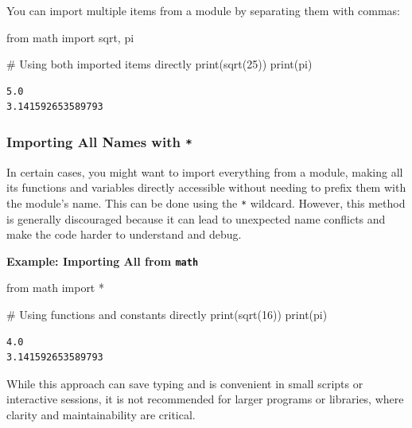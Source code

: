 \documentclass[
  letterpaper,
  DIV=11,
  numbers=noendperiod]{scrreprt}
\newenvironment{Shaded}{\begin{snugshade}}{\end{snugshade}}
\newcommand{\BuiltInTok}[1]{\textcolor[rgb]{0.00,0.23,0.31}{#1}}
\newcommand{\CommentTok}[1]{\textcolor[rgb]{0.37,0.37,0.37}{#1}}
\newcommand{\DecValTok}[1]{\textcolor[rgb]{0.68,0.00,0.00}{#1}}
\newcommand{\ImportTok}[1]{\textcolor[rgb]{0.00,0.46,0.62}{#1}}
\newcommand{\NormalTok}[1]{\textcolor[rgb]{0.00,0.23,0.31}{#1}}
\newcommand{\OperatorTok}[1]{\textcolor[rgb]{0.37,0.37,0.37}{#1}}
\begin{document}
You can import multiple items from a module by separating them with
commas:

\begin{Shaded}
\begin{Highlighting}[]
\ImportTok{from}\NormalTok{ math }\ImportTok{import}\NormalTok{ sqrt, pi}

\CommentTok{\# Using both imported items directly}
\BuiltInTok{print}\NormalTok{(sqrt(}\DecValTok{25}\NormalTok{))  }
\BuiltInTok{print}\NormalTok{(pi)       }
\end{Highlighting}
\end{Shaded}

\begin{verbatim}
5.0
3.141592653589793
\end{verbatim}

\hypertarget{importing-all-names-with}{%
\subsubsection{\texorpdfstring{Importing All Names with
\texttt{*}}{Importing All Names with *}}\label{importing-all-names-with}}

In certain cases, you might want to import everything from a module,
making all its functions and variables directly accessible without
needing to prefix them with the module's name. This can be done using
the \texttt{*} wildcard. However, this method is generally discouraged
because it can lead to unexpected name conflicts and make the code
harder to understand and debug.

\textbf{Example: Importing All from \texttt{math}}

\begin{Shaded}
\begin{Highlighting}[]
\ImportTok{from}\NormalTok{ math }\ImportTok{import} \OperatorTok{*}

\CommentTok{\# Using functions and constants directly}
\BuiltInTok{print}\NormalTok{(sqrt(}\DecValTok{16}\NormalTok{))  }
\BuiltInTok{print}\NormalTok{(pi)       }
\end{Highlighting}
\end{Shaded}

\begin{verbatim}
4.0
3.141592653589793
\end{verbatim}

While this approach can save typing and is convenient in small scripts
or interactive sessions, it is not recommended for larger programs or
libraries, where clarity and maintainability are critical.
\end{document}
